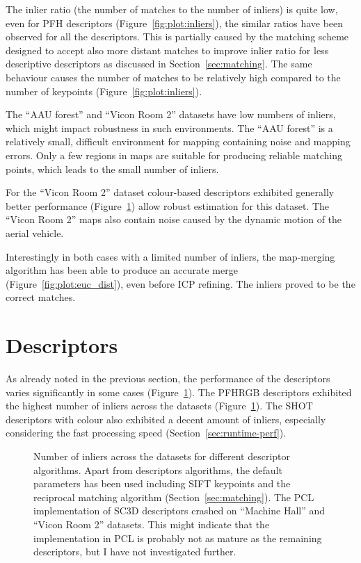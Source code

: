 The inlier ratio (the number of matches to the number of inliers) is quite low, even for \gls{PFH} descriptors (Figure~\ref{fig:plot:inliers}), the similar ratios have been observed for all the descriptors. This is partially caused by the matching scheme designed to accept also more distant matches to improve inlier ratio for less descriptive descriptors as discussed in Section~\ref{sec:matching}. The same behaviour causes the number of matches to be relatively high compared to the number of keypoints (Figure~\ref{fig:plot:inliers}).

The ``AAU forest'' and ``Vicon Room 2'' datasets have low numbers of inliers, which might impact robustness in such environments. The ``AAU forest'' is a relatively small, difficult environment for mapping containing noise and mapping errors. Only a few regions in maps are suitable for producing reliable matching points, which leads to the small number of inliers.

For the ``Vicon Room 2'' dataset colour-based descriptors exhibited generally better performance (Figure~\ref{fig:plot:desc_inliers}) allow robust estimation for this dataset. The ``Vicon Room 2'' maps also contain noise caused by the dynamic motion of the aerial vehicle.

Interestingly in both cases with a limited number of inliers, the map-merging algorithm has been able to produce an accurate merge (Figure~\ref{fig:plot:euc_dist}), even before \gls{ICP} refining. The inliers proved to be the correct matches.

\section{Descriptors}

As already noted in the previous section, the performance of the descriptors varies significantly in some cases (Figure~\ref{fig:plot:desc_inliers}). The \gls{PFHRGB} descriptors exhibited the highest number of inliers across the datasets (Figure~\ref{fig:plot:desc_inliers}). The \gls{SHOT} descriptors with colour also exhibited a decent amount of inliers, especially considering the fast processing speed (Section~\ref{sec:runtime-perf}).

\begin{figure}
  \centering
  
  \caption[Number of inliers per descriptors]{Number of inliers across the datasets for different descriptor algorithms. Apart from descriptors algorithms, the default parameters has been used including \gls{SIFT} keypoints and the reciprocal matching algorithm (Section~\ref{sec:matching}). The \gls{PCL} implementation of \gls{SC3D} descriptors crashed on ``Machine Hall'' and ``Vicon Room 2'' datasets. This might indicate that the implementation in \gls{PCL} is probably not as mature as the remaining descriptors, but I have not investigated further.}
  \label{fig:plot:desc_inliers}
\end{figure}

